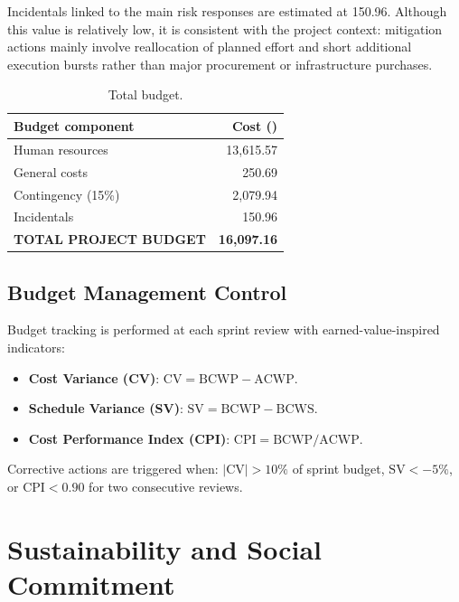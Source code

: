 \documentclass[11pt, a4paper]{article}
\begin{document}
Incidentals linked to the main risk responses are estimated at \EUR{}150.96. Although this value is relatively low, it is consistent with the project context: mitigation actions mainly involve reallocation of planned effort and short additional execution bursts rather than major procurement or infrastructure purchases.

\begin{table}[h!]
    \centering
    \caption{Total budget.}
    \label{tab:total-budget}
    \renewcommand{\arraystretch}{1.2}
    \begin{tabularx}{\linewidth}{X r}
        \toprule
        \textbf{Budget component} & \textbf{Cost (\EUR{})} \\
        \midrule
        Human resources & 13,615.57 \\
        General costs & 250.69 \\
        Contingency (15\%) & 2,079.94 \\
        Incidentals & 150.96 \\
        \midrule
        \textbf{TOTAL PROJECT BUDGET} & \textbf{16,097.16} \\
        \bottomrule
    \end{tabularx}
\end{table}

\subsection{Budget Management Control}
Budget tracking is performed at each sprint review with earned-value-inspired indicators:
\begin{itemize}
    \item \textbf{Cost Variance (CV)}: $\mathrm{CV} = \mathrm{BCWP} - \mathrm{ACWP}$.
    \item \textbf{Schedule Variance (SV)}: $\mathrm{SV} = \mathrm{BCWP} - \mathrm{BCWS}$.
    \item \textbf{Cost Performance Index (CPI)}: $\mathrm{CPI} = \mathrm{BCWP} / \mathrm{ACWP}$.
\end{itemize}

Corrective actions are triggered when: $|\mathrm{CV}| > 10\%$ of sprint budget, $\mathrm{SV} < -5\%$, or $\mathrm{CPI} < 0.90$ for two consecutive reviews.

\clearpage
\section{Sustainability and Social Commitment}
\label{sec:sustainability}
\end{document}
